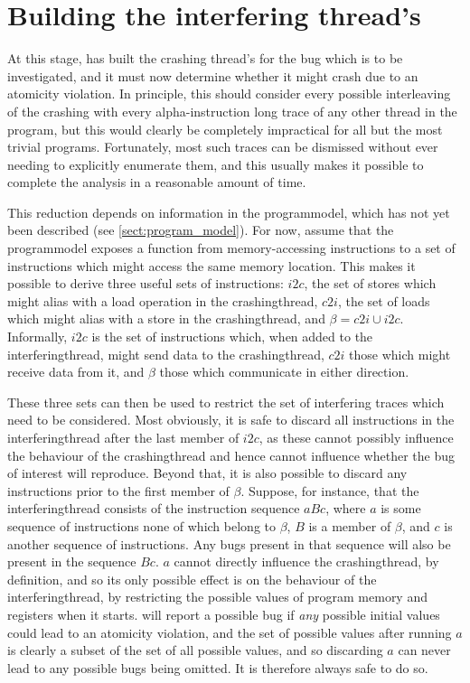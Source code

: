 \section{Building the interfering thread's \StateMachines}
\label{sect:derive:write_side}

At this stage, {\technique} has built the crashing thread's
{\StateMachine} for the bug which is to be investigated, and it must
now determine whether it might crash due to an atomicity violation.
In principle, this should consider every possible interleaving of the
crashing {\StateMachine} with every \gls{alpha}-instruction long trace
of any other thread in the program, but this would clearly be
completely impractical for all but the most trivial programs.
Fortunately, most such traces can be dismissed without ever needing to
explicitly enumerate them, and this usually makes it possible to
complete the analysis in a reasonable amount of time.

This reduction depends on information in the \gls{programmodel}, which
has not yet been described (see \autoref{sect:program_model}).  For
now, assume that the \gls{programmodel} exposes a function from
memory-accessing instructions to a set of instructions which might
access the same memory location.  This makes it possible to derive
three useful sets of instructions: $i2c$, the set of stores which
might alias with a load operation in the \gls{crashingthread}, $c2i$,
the set of loads which might alias with a store in the
\gls{crashingthread}, and $\beta = c2i \cup i2c$.  Informally, $i2c$
is the set of instructions which, when added to the
\gls{interferingthread}, might send data to the \gls{crashingthread},
$c2i$ those which might receive data from it, and $\beta$ those which
communicate in either direction.

These three sets can then be used to restrict the set of interfering
traces which need to be considered.  Most obviously, it is safe to
discard all instructions in the \gls{interferingthread} after the last
member of $i2c$, as these cannot possibly influence the behaviour of
the \gls{crashingthread} and hence cannot influence whether the bug of
interest will reproduce.  Beyond that, it is also possible to discard
any instructions prior to the first member of $\beta$.  Suppose, for
instance, that the \gls{interferingthread} consists of the instruction
sequence $aBc$, where $a$ is some sequence of instructions none of
which belong to $\beta$, $B$ is a member of $\beta$, and $c$ is
another sequence of instructions.  Any bugs present in that sequence
will also be present in the sequence $Bc$.  $a$ cannot directly
influence the \gls{crashingthread}, by definition, and so its only
possible effect is on the behaviour of the \gls{interferingthread}, by
restricting the possible values of program memory and registers when
it starts.  {\Technique} will report a possible bug if \emph{any}
possible initial values could lead to an atomicity violation, and the
set of possible values after running $a$ is clearly a subset of the
set of all possible values, and so discarding $a$ can never lead to
any possible bugs being omitted.  It is therefore always safe to do
so.

